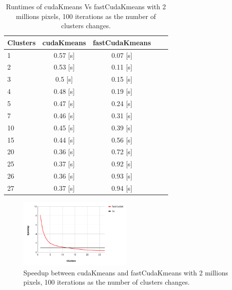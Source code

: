 \documentclass[10pt,twocolumn,letterpaper]{article}
\begin{document}
\begin{table}[H]
\begin{center}
\begin{tabular}{|l|c|c|c|c|}
\hline
Clusters & cudaKmeans & fastCudaKmeans \\
\hline\hline
1 & 0.57 [s] & 0.07 [s] \\
2 & 0.53 [s] & 0.11 [s] \\
3 & 0.5 [s] & 0.15 [s] \\
4 & 0.48 [s] & 0.19 [s] \\
5 & 0.47 [s] & 0.24 [s] \\
7 & 0.46 [s] & 0.31 [s] \\
10 & 0.45 [s] & 0.39 [s] \\
15 & 0.44 [s] & 0.56 [s] \\
20 & 0.36 [s] & 0.72 [s] \\
25 & 0.37 [s] & 0.92 [s] \\
26 & 0.36 [s] & 0.93 [s] \\
27 & 0.37 [s] & 0.94 [s] \\
\hline
\end{tabular}
\end{center}
\caption{Runtimes of cudaKmeans Vs fastCudaKmeans with 2 millions pixels, 100 iterations as the number of clusters changes.}
\end{table}

\begin{figure}[H]
\begin{center}
\includegraphics[width=0.5\textwidth]{latex/5s.png}
\caption{Speedup between cudaKmeans and fastCudaKmeans with 2 millions pixels, 100 iterations as the number of clusters changes.}
\label{etichetta}
\end{center}
\end{figure}
\end{document}
